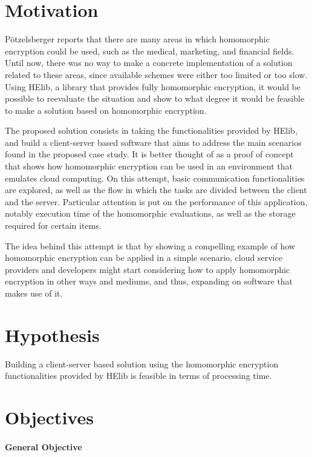 \section{Motivation}

P{\"o}tzelsberger \cite{potzelsberger2013kv} reports that there are many areas in which homomorphic encryption could be used, such as the medical, marketing, and financial fields. Until now, there was no way to make a concrete implementation of a solution related to these areas, since available schemes were either too limited or too slow. Using HElib, a library that provides fully homomorphic encryption, it would be possible to reevaluate the situation and show to what degree it would be feasible to make a solution based on homomorphic encryption.

The proposed solution consists in taking the functionalities provided by HElib, and build a client-server based software that aims to address the main scenarios found in the proposed case study. It is better thought of as a proof of concept that shows how homomorphic encryption can be used in an environment that emulates cloud computing. On this attempt, basic communication functionalities are explored, as well as the flow in which the tasks are divided between the client and the server. Particular attention is put on the performance of this application, notably execution time of the homomorphic evaluations, as well as the storage required for certain items.

The idea behind this attempt is that by showing a compelling example of how homomorphic encryption can be applied in a simple scenario, cloud service providers and developers might start considering how to apply homomorphic encryption in other ways and mediums, and thus, expanding on software that makes use of it.

\section{Hypothesis}

Building a client-server based solution using the homomorphic encryption functionalities provided by HElib is feasible in terms of processing time.

\section{Objectives}

\paragraph{General Objective}


